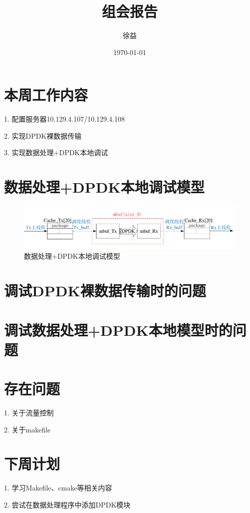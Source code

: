 \documentclass{article}
\title{组会报告}
\author{徐益}
\date{\today}
\begin{document}
	
\maketitle


\section{本周工作内容}

1. 配置服务器10.129.4.107/10.129.4.108

2. 实现DPDK裸数据传输

3. 实现数据处理+DPDK本地调试

\section{数据处理+DPDK本地调试模型}

\begin{figure}[H]
	\centering
	\includegraphics[width = \textwidth]{frame_mbuf.pdf}
	\caption{数据处理+DPDK本地调试模型}
\end{figure}

\section{调试DPDK裸数据传输时的问题}


\section{调试数据处理+DPDK本地模型时的问题}


\section{存在问题}
1. 关于流量控制

2. 关于makefile

\section{下周计划}
1. 学习Makefile、cmake等相关内容

2. 尝试在数据处理程序中添加DPDK模块
\end{document}
